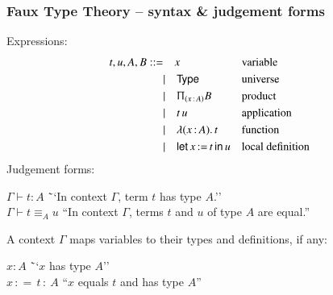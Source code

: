 \documentclass[10pt]{beamer}
\newcommand{\of}{\,{:}\,} %
\newcommand{\ofLet}[3]{#1 \,{:}{=}\, #2 \,{:}\ #3} %
\newcommand{\Type}{\mathsf{Type}}
\newcommand{\prd}[1]{\Uppi_{(#1)}}
\newcommand{\lam}[1]{\lambda (#1).\,}
\newcommand{\letin}[3]{\mathsf{let}\,#1\,{{:}{=}}\,#2\,\mathsf{in}\,#3}
\begin{document}
\begin{frame}
  \frametitle{Faux Type Theory -- syntax \& judgement forms}

  Expressions:
  \begin{align*}
    t, u, A, B \mathrel{{:}{:}{=}}&\quad
     x                       &&\text{variable} \\
    &{\mid}\quad \Type           &&\text{universe} \\
    &{\mid}\quad \prd{x \of A} B &&\text{product} \\
    &{\mid}\quad t\,u            &&\text{application} \\
    &{\mid}\quad \lam{x \of A} t &&\text{function} \\
    &{\mid}\quad \letin{x}{t}{u} &&\text{local definition}
  \end{align*}
  \pause
  Judgement forms:
  \begin{tabbing}
      $\Gamma \vdash t : A$ \qquad\qquad \= ``In context $\Gamma$, term $t$ has type $A$.'' \\
      $\Gamma \vdash t \equiv_A u$ \> ``In context $\Gamma$, terms $t$ and $u$ of type $A$ are equal.''
  \end{tabbing}
  \pause
  A context $\Gamma$ maps variables to their types and definitions, if any:
  \begin{tabbing}
    $x : A$ \qquad\qquad \= ``$x$ has type $A$''\\
    $\ofLet{x}{t}{A}$ \> ``$x$ equals $t$ and has type $A$''
  \end{tabbing}

\end{frame}
\end{document}
